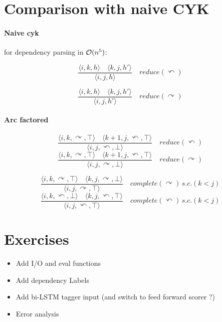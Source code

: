 \documentclass[11pt,openany]{book}
\begin{document}
\section{Comparison with naive CYK}

\paragraph{Naive {\sc cyk}} for dependency parsing in ${\cal O}(n^5)$:

\begin{displaymath}
\frac{\langle i,k,h \rangle\quad \langle k,j,h' \rangle}
{\langle i,j,h\rangle} \quad reduce(\curvearrowleft)
\end{displaymath}

\begin{displaymath}
\frac{\langle i,k,h \rangle\quad \langle k,j,h' \rangle}
{\langle i,j,h'\rangle} \quad reduce(\curvearrowright)
\end{displaymath}

\paragraph{Arc factored}

\begin{displaymath}
\frac{\langle i,k,\curvearrowright,\top \rangle\quad \langle k+1,j,\curvearrowleft,\top \rangle}
{\langle i,j,\curvearrowleft,\bot \rangle} \quad reduce(\curvearrowleft)
\end{displaymath}
\begin{displaymath}
\frac{\langle i,k,\curvearrowright,\top \rangle\quad \langle k+1,j,\curvearrowleft,\top \rangle}
{\langle i,j,\curvearrowright,\bot \rangle} \quad reduce(\curvearrowright)
\end{displaymath}

\begin{displaymath}
\frac{\langle i,k,\curvearrowright,\top \rangle\quad \langle k,j,\curvearrowright,\bot \rangle}
{\langle i,j,\curvearrowright,\top \rangle} \quad complete(\curvearrowright) \, s.c. (k < j)
\end{displaymath}
\begin{displaymath}
\frac{\langle i,k,\curvearrowleft,\bot \rangle\quad \langle k,j,\curvearrowleft,\top \rangle}
{\langle i,j,\curvearrowleft,\top \rangle} \quad complete(\curvearrowleft) \, s.c. (k < j)
\end{displaymath}



\section{Exercises}
\begin{itemize}
\item Add I/O and eval functions
\item Add dependency Labels
\item Add bi-LSTM tagger input (and switch to feed forward scorer ?)
\item Error analysis
\end{itemize}
\end{document}

